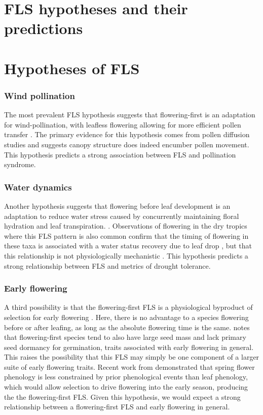 \documentclass{article}
\begin{document}
\section*{FLS hypotheses and their predictions}
\section*{Hypotheses of FLS}
\subsubsection*{ Wind pollination}
\noindent The most prevalent FLS hypothesis suggests that flowering-first is an adaptation for wind-pollination, with leafless flowering allowing for more efficient pollen transfer \citep{Whitehead1969, Spurr1980,Friedman2009}. The primary evidence for this hypothesis comes from pollen diffusion studies \citep[e.g., particle movement through closed and open canopies,][]{Niklas1985,Nathan2005, Milleron2012} and suggests canopy structure does indeed encumber pollen movement. This hypothesis predicts a strong association between FLS and pollination syndrome.
\subsubsection*{Water dynamics}
\noindent Another hypothesis suggests that flowering before leaf development is an adaptation to reduce water stress caused by concurrently maintaining floral hydration and leaf transpiration. \citep{Franklin2016}. Observations of flowering in the dry tropics where this FLS pattern is also common confirm that the timing of flowering in these taxa is associated with a water status recovery due to leaf drop \citep{Borchert1983,Reich1984}, but that this relationship is not physiologically mechanistic \citep{Franklin2016}. This hypothesis predicts a strong relationship between FLS and metrics of drought tolerance.

\subsubsection*{Early flowering}
\noindent A third possibility is that the flowering-first FLS is a physiological byproduct of selection for early flowering \citep{Primack1987}. Here, there is no advantage to a species flowering before or after leafing, as long as the absolute flowering time is the same. \citet{Primack1987} notes that flowering-first species tend to also have large seed mass and lack primary seed dormancy for germination, traits associated with early flowering in general. This raises the possibility that this FLS may simply be one component of a larger suite of early flowering traits. Recent work from \citet{Savage2019} demonstrated that spring flower phenology is less constrained by prior phenological events than leaf phenology, which would allow selection to drive flowering into the early season, producing the the flowering-first FLS. Given this hypothesis, we would expect a strong relationship between a flowering-first FLS and early flowering in general.
\end{document}
